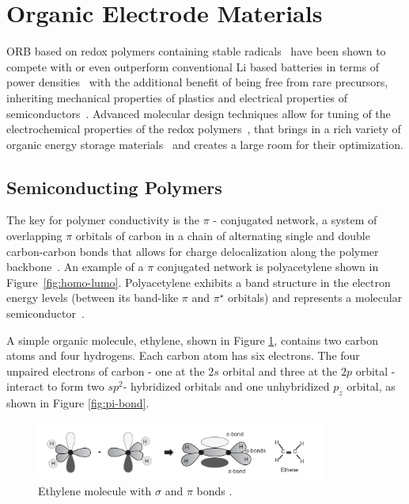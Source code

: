 \section{Organic Electrode Materials}
\label{sec:ORB_materials}
ORB based on redox polymers containing stable radicals~\cite{nakahara2002_cpl} have been shown to compete with or even outperform  conventional Li based batteries in terms of power densities~\cite{IWASA2007} with the additional benefit of being free from rare precursors, inheriting mechanical properties of plastics and electrical properties of semiconductors~\cite{friebe2017_topcurrchem,Casado2021,Goujon2021}. Advanced molecular design techniques allow for tuning of the electrochemical properties of the redox polymers~\cite{Janoschka2017}, that brings in a rich variety of organic energy storage materials~\cite{Xie2021,Vereshchagin2022,Janoschka2017a} and creates a large room for their optimization. 

\subsection{Semiconducting Polymers}
\par
The key for polymer conductivity is the $\pi$ - conjugated network, a system of overlapping $\pi$ orbitals of carbon in a chain of alternating single and double carbon-carbon bonds that allows for charge delocalization along the polymer backbone~\cite{heeger_polymers,Koehler_book,Casado_2021_book}. An example of a $\pi$ conjugated network is polyacetylene shown in Figure~\ref{fig:homo-lumo}. Polyacetylene exhibits a band structure in the electron energy levels (between its band-like $\pi$ and $\pi^\star$ orbitals) and represents a molecular semiconductor~\cite{heeger_polymers}.\\
\par
A simple organic molecule, ethylene, shown in Figure \ref{fig:ethylene}, contains two carbon atoms and four hydrogens. Each carbon atom has six electrons. The four unpaired electrons of carbon - one at the $2s$ orbital and three at the $2p$ orbital - interact to form two $sp^2$- hybridized orbitals and one unhybridized $p_z$ orbital, as shown in Figure \ref{fig:pi-bond}. 

\begin{figure} [h]
\centering
\includegraphics[width = 0.85\textwidth]{./electrochemistry/figures/ethylene.png}
\caption{Ethylene molecule with $\sigma$ and $\pi$ bonds \cite{Koehler_book}.}
\label{fig:ethylene}
\end{figure}

